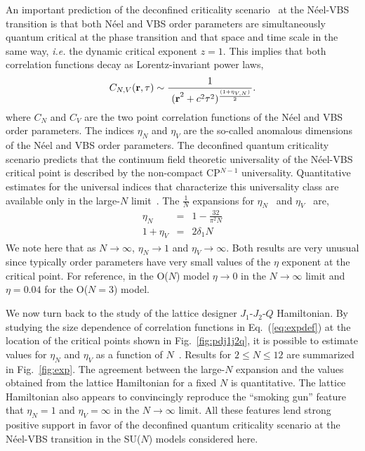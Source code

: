 \documentclass[range]{ar2e}
\begin{document}
An important prediction of the deconfined criticality scenario~\cite{Senthil04a} at the
N\'eel-VBS transition is that both N\'eel and VBS order parameters are
simultaneously quantum critical at the phase transition and that space
and time scale in the same way, {\em i.e.} the dynamic critical exponent $z=1$. This implies
that both correlation functions decay as Lorentz-invariant power laws,
\begin{equation}
\label{eq:expdef}
C_{N,V} ({\bf r},\tau) \sim  \frac{1}{~{(\bf r}^2+c^2\tau^2)^{\frac{(1+\eta_{V,N})}{2}}}.
\end{equation}
 where $C_N$ and $C_V$ are the two point correlation functions of the
 N\'eel and VBS order parameters. The indices $\eta_N$ and $\eta_V$
 are the so-called anomalous dimensions of the N\'eel and VBS order
 parameters. The deconfined quantum criticality scenario predicts that
 the continuum field theoretic universality of the N\'eel-VBS critical
 point is described by the non-compact CP$^{N-1}$ universality. Quantitative
 estimates for the universal indices that characterize this
 universality class are available only in the large-$N$
 limit~\cite{halperin1974:largeN}. The $\frac{1}{N}$ expansions for $\eta_N$~\cite{kaul2008:u1} and $\eta_V$~\cite{murthy1990:mono,metlitski2008:mono} are,
\begin{eqnarray}
\label{eq:oneonN}
\eta_N &=& 1 - \frac{32}{\pi^2N}\nonumber\\
1+\eta_V &=& 2 \delta_1 N
\end{eqnarray}
We note here that as $N\rightarrow\infty$, $\eta_N \rightarrow 1$ and
$\eta_V\rightarrow \infty$. Both results are very unusual since
typically order parameters have very small values of the $\eta$
exponent at the critical point. For reference, in the O($N$) model $\eta\rightarrow
0$ in the $N\rightarrow\infty$ limit and $\eta=0.04$ for the O($N=3$) model.

We now turn back to the study of the lattice designer $J_1$-$J_2$-$Q$
Hamiltonian. By studying the size dependence of correlation functions in Eq.~(\ref{eq:expdef})
 at the location of the critical points shown in Fig.~\ref{fig:pdj1j2q}, it is possible to
 estimate values for $\eta_N$ and $\eta_V$ as a function
 of $N$~\cite{lou2009:sun,kaul2011:j1j2}. Results for $2\leq N \leq 12$ are summarized in Fig.~\ref{fig:exp}. The
 agreement between the large-$N$ expansion and the values obtained from the
 lattice Hamiltonian for a fixed $N$ is quantitative. The lattice
 Hamiltonian also appears to convincingly reproduce the ``smoking gun'' feature that
 $\eta_N=1$ and $\eta_V=\infty$ in the $N\rightarrow \infty$
 limit. All these features lend strong positive support in favor of
 the deconfined quantum criticality scenario at the N\'eel-VBS
 transition in the SU($N$) models considered here.
\end{document}
